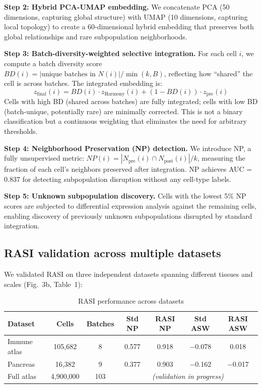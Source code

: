\documentclass[10pt]{article}
\begin{document}
\textbf{Step 2: Hybrid PCA-UMAP embedding.} We concatenate PCA (50 dimensions, capturing global structure) with UMAP (10 dimensions, capturing local topology) to create a 60-dimensional hybrid embedding that preserves both global relationships and rare subpopulation neighborhoods.

\textbf{Step 3: Batch-diversity-weighted selective integration.} For each cell $i$, we compute a batch diversity score $BD(i) = |\text{unique batches in } N(i)| / \min(k, B)$, reflecting how ``shared'' the cell is across batches. The integrated embedding is:
$$z_{\text{final}}(i) = BD(i) \cdot z_{\text{Harmony}}(i) + (1 - BD(i)) \cdot z_{\text{pre}}(i)$$
Cells with high BD (shared across batches) are fully integrated; cells with low BD (batch-unique, potentially rare) are minimally corrected. This is not a binary classification but a continuous weighting that eliminates the need for arbitrary thresholds.

\textbf{Step 4: Neighborhood Preservation (NP) detection.} We introduce NP, a fully unsupervised metric: $NP(i) = |N_{\text{pre}}(i) \cap N_{\text{post}}(i)| / k$, measuring the fraction of each cell's neighbors preserved after integration. NP achieves AUC = 0.837 for detecting subpopulation disruption without any cell-type labels.

\textbf{Step 5: Unknown subpopulation discovery.} Cells with the lowest 5\% NP scores are subjected to differential expression analysis against the remaining cells, enabling discovery of previously unknown subpopulations disrupted by standard integration.

\subsection{RASI validation across multiple datasets}

We validated RASI on three independent datasets spanning different tissues and scales (Fig.~3b, Table~1):

\begin{table}[h]
\centering
\caption{RASI performance across datasets}
\begin{tabular}{lcccccc}
\toprule
Dataset & Cells & Batches & Std NP & RASI NP & Std ASW & RASI ASW \\
\midrule
Immune atlas & 105,682 & 8 & 0.577 & 0.918 & $-$0.078 & 0.018 \\
Pancreas & 16,382 & 9 & 0.377 & 0.903 & $-$0.162 & $-$0.017 \\
Full atlas & 4,900,000 & 103 & \multicolumn{4}{c}{\textit{(validation in progress)}} \\
\bottomrule
\end{tabular}
\end{table}
\end{document}
